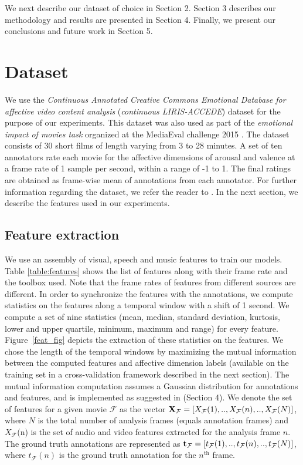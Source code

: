 \documentclass{article}
\begin{document}
We next describe our dataset of choice in Section 2.
Section 3 describes our methodology and results are presented in Section 4. 
Finally, we present our conclusions and future work in Section 5.

\section{Dataset}

We use the {\it Continuous Annotated Creative Commons Emotional Database for affective video content analysis} ({\it continuous LIRIS-ACCEDE}) dataset for the purpose of our experiments.
This dataset was also used as part of the {\it emotional impact of movies task} organized at the MediaEval challenge 2015 \cite{sjoberg2015mediaeval}.
The dataset consists of 30 short films of length varying from 3 to 28 minutes.
A set of ten annotators rate each movie for the affective dimensions of arousal and valence at a frame rate of 1 sample per second, within a range of -1 to 1.
The final ratings are obtained as frame-wise mean of annotations from each annotator. 
For further information regarding the dataset, we refer the reader to \cite{baveye2015liris}.
In the next section, we describe the features used in our experiments.

\subsection{Feature extraction} \label{feature_extraction}
We use an assembly of visual, speech and music features to train our models.
Table \ref{table:features} shows the list of features along with their frame rate and the toolbox used. 
Note that the frame rates of features from different sources are different.
In order to synchronize the features with the annotations, we compute statistics on the features along a temporal window with a shift of 1 second. 
We compute a set of nine statistics (mean, median, standard deviation, kurtosis, lower and upper quartile, minimum, maximum and range) for every feature. 
Figure~\ref{feat_fig} depicts the extraction of these statistics on the features.
We chose the length of the temporal windows by maximizing the mutual information between the computed features and affective dimension labels (available on the training set in a cross-validation framework described in the next section).
The mutual information computation assumes a Gaussian distribution for annotations and features, and is implemented as suggested in \cite{mariooryad2015correcting} (Section 4). 
We denote the set of features for a given movie $\mathcal{F}$ as the vector ${\bf X}_{\mathcal{F}} = [X_{\mathcal{F}}(1), .., X_{\mathcal{F}}(n), .., X_{\mathcal{F}}(N) ]$, where $N$ is the total number of analysis frames (equals annotation frames) and $X_{\mathcal{F}}$(n) is the set of audio and video features extracted for the analysis frame $n$.
The ground truth annotations are represented as ${\bf t}_{\mathcal F} = [t_\mathcal F(1), .., t_\mathcal F(n), .., t_\mathcal F(N)]$, where $t_\mathcal F(n)$ is the ground truth annotation for the $n^\text{th}$ frame. 
\end{document}
